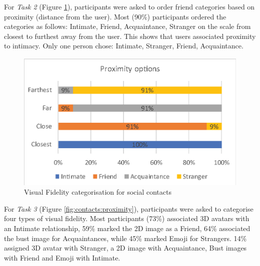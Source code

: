 

For \textit{Task 2} (Figure \ref{fig:contacts:visual-fidelity}), participants were asked to order friend categories based on proximity (distance from the user). Most (90\%) participants ordered the categories as follows: Intimate, Friend, Acquaintance, Stranger on the scale from closest to furthest away from the user. This shows that users associated proximity to intimacy. Only one person chose: Intimate, Stranger, Friend, Acquaintance. 

\begin{figure}[ht]
    \centering
    \includegraphics[width=0.8\linewidth]{images/41-visualising-mgia17/analysis-images-06.eps}
    \caption{Visual Fidelity categorisation for social contacts}
    \label{fig:contacts:visual-fidelity}
\end{figure}

For \textit{Task 3} (Figure \ref{fig:contacts:proximity}), participants were asked to categorise four types of visual fidelity. Most participants (73\%) associated 3D avatars with an Intimate relationship, 59\% marked the 2D image as a  Friend, 64\% associated the bust image for Acquaintances, while 45\% marked Emoji for Strangers. 14\% assigned 3D avatar with Stranger, a 2D image with Acquaintance, Bust images with Friend and Emoji with Intimate. 


